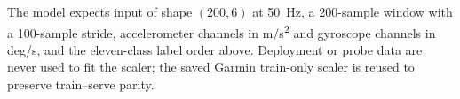 The model expects input of shape \((200,6)\) at 50~Hz, a 200-sample window with a 100-sample stride, accelerometer channels in m/s\textsuperscript{2} and gyroscope channels in deg/s, and the eleven-class label order above. Deployment or probe data are never used to fit the scaler; the saved Garmin train-only scaler is reused to preserve train--serve parity.
